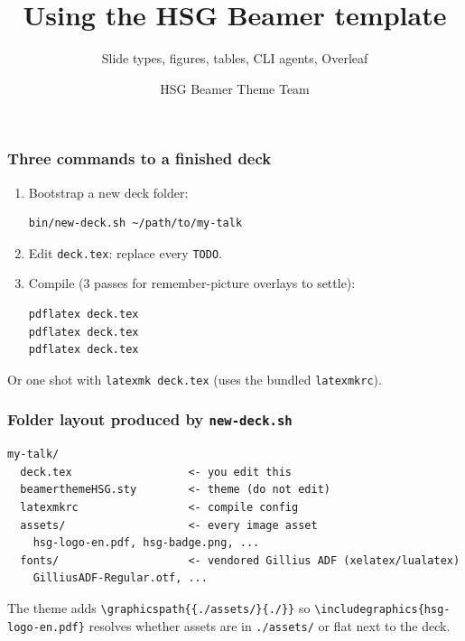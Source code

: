 \documentclass[aspectratio=169]{beamer}
\title{Using the HSG Beamer template}
\subtitle{Slide types, figures, tables, CLI agents, Overleaf}
\author{HSG Beamer Theme Team}
\institute{University of St.\,Gallen}
\date{}
\begin{document}
\begin{frame}[plain]\titlepage\end{frame}



\begin{frame}[t,fragile]
  \frametitle{Three commands to a finished deck}

  \begin{enumerate}
    \setlength\itemsep{0.4em}
    \item Bootstrap a new deck folder:
      \begin{lstlisting}
bin/new-deck.sh ~/path/to/my-talk
      \end{lstlisting}
    \item Edit \texttt{deck.tex}: replace every \texttt{TODO}.
    \item Compile (3 passes for remember-picture overlays to settle):
      \begin{lstlisting}
pdflatex deck.tex
pdflatex deck.tex
pdflatex deck.tex
      \end{lstlisting}
  \end{enumerate}

  Or one shot with \texttt{latexmk deck.tex} (uses the bundled
  \texttt{latexmkrc}).
\end{frame}

\begin{frame}[t,fragile]
  \frametitle{Folder layout produced by \texttt{new-deck.sh}}

  \begin{lstlisting}
my-talk/
  deck.tex                  <- you edit this
  beamerthemeHSG.sty        <- theme (do not edit)
  latexmkrc                 <- compile config
  assets/                   <- every image asset
    hsg-logo-en.pdf, hsg-badge.png, ...
  fonts/                    <- vendored Gillius ADF (xelatex/lualatex)
    GilliusADF-Regular.otf, ...
  \end{lstlisting}

  The theme adds \texttt{\textbackslash graphicspath\{\{./assets/\}\{./\}\}}
  so \texttt{\textbackslash includegraphics\{hsg-logo-en.pdf\}} resolves
  whether assets are in \texttt{./assets/} or flat next to the deck.
\end{frame}
\end{document}
